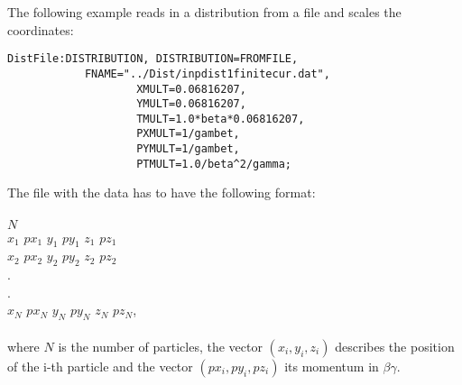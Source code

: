 The following example reads in a distribution from a file and scales the coordinates:
\begin{verbatim}
DistFile:DISTRIBUTION, DISTRIBUTION=FROMFILE,
			FNAME="../Dist/inpdist1finitecur.dat",
                   	XMULT=0.06816207,
                   	YMULT=0.06816207,
                   	TMULT=1.0*beta*0.06816207,
                   	PXMULT=1/gambet,
                   	PYMULT=1/gambet,
                   	PTMULT=1.0/beta^2/gamma;
\end{verbatim}

The file with the data has to have the following format:\\
\\
$N$\\
$x_1$ $px_1$ $y_1$ $py_1$ $z_1$ $pz_1$\\
$x_2$ $px_2$ $y_2$ $py_2$ $z_2$ $pz_2$\\
.\\
.\\
$x_N$ $px_N$ $y_N$ $py_N$ $z_N$ $pz_N$,\\
\\
where $N$ is the number of particles, the vector $(x_i,y_i,z_i)$ describes the position of the i-th particle and the vector $(px_i, py_i, pz_i)$ its momentum in $\beta \gamma$.
